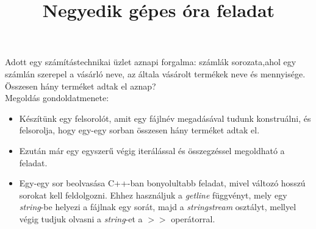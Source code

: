 \documentclass[12pt,a4paper]{article}
\title{Negyedik gépes óra feladat}
\begin{document}
\maketitle

Adott egy számítástechnikai üzlet aznapi forgalma: számlák sorozata,ahol egy számlán szerepel a vásárló neve, az általa vásárolt termékek neve és mennyisége. Összesen hány terméket adtak el aznap? \\

Megoldás gondoldatmenete:
\begin{itemize}
\item Készítünk egy felsorolót, amit egy fájlnév megadásával tudunk konstruálni, és felsorolja, hogy egy-egy sorban összesen hány terméket adtak el.
\item Ezután már egy egyszerű végig iterálással és összegzéssel megoldható a feladat.
\item Egy-egy sor beolvasása C++-ban bonyolultabb feladat, mivel változó hosszú sorokat kell feldolgozni. Ehhez használjuk a \textit{getline} függvényt, mely egy \textit{string}-be helyezi a fájlnak egy sorát, majd a \textit{stringstream} osztályt, mellyel végig tudjuk olvasni a \textit{string}-et a $>>$ operátorral. 
\end{itemize}
\end{document}
